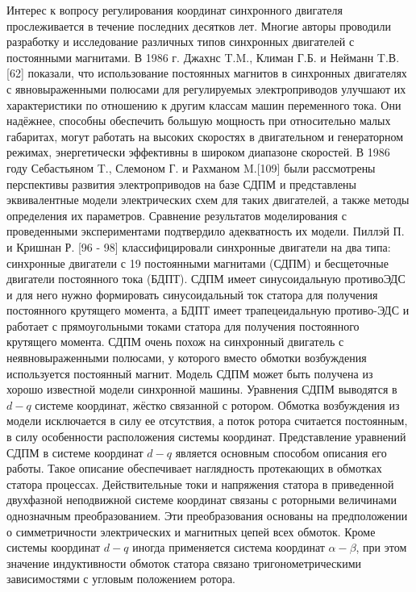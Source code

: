 Интерес к вопросу регулирования координат синхронного двигателя прослеживается в течение последних десятков лет. Многие авторы проводили разработку и исследование различных типов синхронных двигателей с постоянными магнитами.
В 1986 г. Джахнс T.M., Климан Г.Б. и Нейманн T.В. [62] показали, что использование постоянных магнитов в синхронных двигателях с явновыраженными полюсами для регулируемых электроприводов улучшают их характеристики по отношению к другим классам машин переменного тока. Они надёжнее, способны обеспечить большую мощность при относительно малых габаритах, могут работать на высоких скоростях в двигательном и генераторном режимах, энергетически эффективны в широком диапазоне скоростей.
В 1986 году Себастьяном T., Слемоном Г. и Рахманом M.[109] были рассмотрены перспективы развития электроприводов на базе СДПМ и представлены эквивалентные модели электрических схем для таких двигателей, а также методы определения их параметров. Сравнение результатов моделирования с проведенными экспериментами подтвердило адекватность их модели. 
Пиллэй П. и Кришнан Р. [96 - 98] классифицировали синхронные двигатели на два типа: синхронные двигатели с 19 постоянными магнитами (СДПМ) и бесщеточные двигатели постоянного тока (БДПТ). СДПМ имеет синусоидальную противоЭДС и для него нужно формировать синусоидальный ток статора для получения постоянного крутящего момента, а БДПТ имеет трапецеидальную противо-ЭДС и работает с прямоугольными токами статора для получения постоянного крутящего момента. СДПМ очень похож на синхронный двигатель с неявновыраженными полюсами, у которого вместо обмотки возбуждения используется постоянный магнит.
Модель СДПМ может быть получена из хорошо известной модели синхронной машины. Уравнения СДПМ выводятся в $d-q$ системе координат, жёстко связанной с ротором. Обмотка возбуждения из модели исключается в силу ее отсутствия, а поток ротора считается постоянным, в силу особенности расположения системы координат. 
Представление уравнений СДПМ в системе координат $d-q$ является основным способом описания его работы. Такое описание обеспечивает наглядность протекающих в обмотках статора процессах. Действительные токи и напряжения статора в приведенной двухфазной неподвижной системе координат связаны с роторными величинами однозначным преобразованием. Эти преобразования основаны на предположении о симметричности электрических и магнитных цепей всех обмоток. Кроме системы координат $d-q$ иногда применяется система координат $\alpha-\beta$, при этом значение индуктивности обмоток статора связано тригонометрическими зависимостями с угловым положением ротора. 
